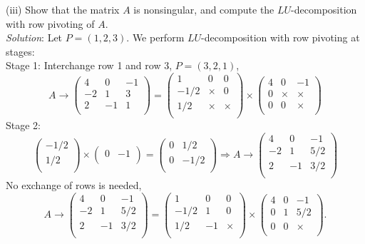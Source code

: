 \documentclass[paper=a4, fontsize=11pt]{scrartcl} %
\numberwithin{equation}{section} %
\numberwithin{figure}{section} %
\numberwithin{table}{section} %
\begin{document}
(iii) Show that the matrix $A$ is nonsingular, and compute the $LU$-decomposition with row pivoting of $A$.\\
\textit{Solution}: Let $P = (1,2,3)$. We perform $LU$-decomposition with row pivoting at stages:\\
\newline
Stage 1: Interchange row 1 and row 3, $P = (3,2,1)$,
$$
A \rightarrow \begin{pmatrix}
4 & 0 & -1 \\
-2 & 1 & 3 \\
2 & -1 & 1 \\
\end{pmatrix}
=
\begin{pmatrix}
1 & 0 & 0 \\
-1/2 & \times & 0 \\
1/2 & \times & \times \\
\end{pmatrix}
\times
\begin{pmatrix}
4 & 0 & -1 \\
0 & \times & \times \\
0 & 0 & \times \\
\end{pmatrix}
$$
Stage 2:
$$
\begin{pmatrix}
-1/2  \\
1/2 \\
\end{pmatrix}
\times
\begin{pmatrix}
0 & -1 \\
\end{pmatrix}
=
\begin{pmatrix}
0 & 1/2\\
0 & -1/2 \\
\end{pmatrix}
\Rightarrow
A \rightarrow
\begin{pmatrix}
4 & 0 & -1 \\
-2 & 1 & 5/2 \\
2 & -1 & 3/2 \\
\end{pmatrix}
$$
No exchange of rows is needed,
$$
A \rightarrow
\begin{pmatrix}
4 & 0 & -1 \\
-2 & 1 & 5/2 \\
2 & -1 & 3/2 \\
\end{pmatrix}
=
\begin{pmatrix}
1 & 0 & 0 \\
-1/2 & 1 & 0 \\
1/2 & -1  & \times \\
\end{pmatrix}
\times
\begin{pmatrix}
4 & 0 & -1 \\
0 & 1 & 5/2 \\
0 & 0 & \times \\
\end{pmatrix}.
$$
\end{document}
